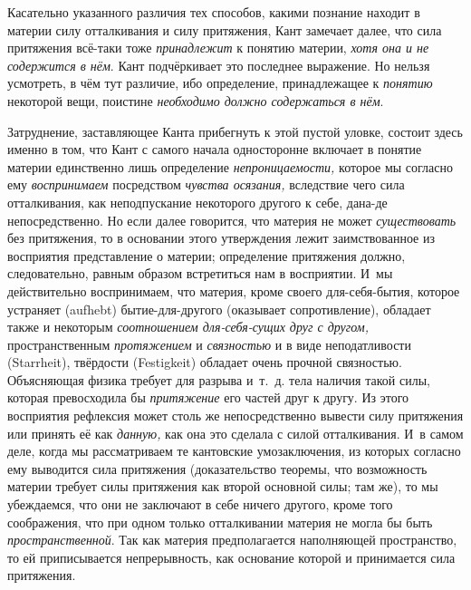 Касательно указанного различия тех способов, какими познание находит в
материи силу отталкивания и силу притяжения, Кант замечает далее, что сила
притяжения всё-таки тоже {\em принадлежит} к понятию
материи, {\em хотя она и не содержится в нём}. Кант
подчёркивает это последнее выражение. Но нельзя усмотреть, в чём тут
различие, ибо определение, принадлежащее к
{\em понятию} некоторой вещи, поистине
{\em необходимо должно содержаться в нём}.

Затруднение, заставляющее Канта прибегнуть к этой пустой уловке, состоит
здесь именно в том, что Кант с самого начала односторонне включает в
понятие материи единственно лишь определение
{\em непроницаемости,} которое мы согласно ему
{\em воспринимаем} посредством
{\em чувства осязания,} вследствие чего сила
отталкивания, как неподпускание некоторого другого к себе, дана-де
непосредственно. Но если далее говорится, что материя не может
{\em существовать} без притяжения, то в основании этого
утверждения лежит заимствованное из восприятия представление о материи;
определение притяжения должно, следовательно, равным образом встретиться
нам в восприятии. И~мы действительно воспринимаем, что материя, кроме
своего для-себя-бытия, которое устраняет (aufhebt) бытие-для-другого
(оказывает сопротивление), обладает также и некоторым
{\em соотношением для-себя-сущих друг с другом,}
пространственным {\em протяжением} и
{\em связностью} и в виде неподатливости (Starrheit),
твёрдости (Festigkeit) обладает очень прочной связностью. Объясняющая
физика требует для разрыва и~т.~д. тела наличия такой силы, которая
превосходила бы {\em притяжение} его частей друг к
другу. Из этого восприятия рефлексия может столь же непосредственно вывести
силу притяжения или принять её как {\em данную,} как
она это сделала с силой отталкивания. И~в самом деле, когда мы
рассматриваем те кантовские умозаключения, из которых согласно ему
выводится сила притяжения (доказательство теоремы, что возможность материи
требует силы притяжения как второй основной силы; там же), то мы
убеждаемся, что они не заключают в себе ничего другого, кроме того
соображения, что при одном только отталкивании материя не могла бы быть
{\em пространственной}. Так как материя предполагается
наполняющей пространство, то ей приписывается непрерывность, как основание
которой и принимается сила притяжения.

